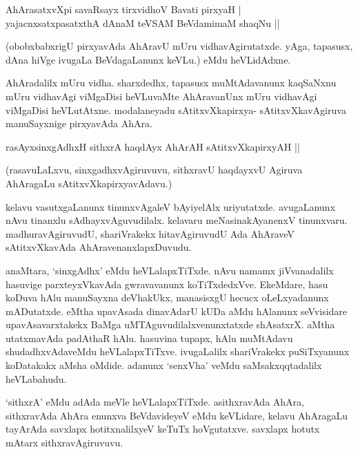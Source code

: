 \begin{shloka}
AhArasatxvXpi savaRsayx tirxvidhoV Bavati pirxyaH |\\
yajacnxsatxpasatxthA dAnaM teVSAM BeVdamimaM shaqNu ||
\end{shloka}

(obobxbabxrigU pirxyavAda AhAravU mUru vidhavAgirutatxde. yAga, tapasusx, dAna hiVge ivugaLa BeVdagaLanunx keVLu.) eMdu heVLidAdxne.


AhAradalilx mUru vidha. sharxdedhx, tapasusx muMtAdavanunx  kaqSaNxnu mUru vidhavAgi viMgaDisi heVLuvaMte AhAravanUnx mUru vidhavAgi viMgaDisi heVLutAtxne. modalaneyadu sAtitxvXkapirxya- sAtitxvXkavAgiruva manuSayxnige pirxyavAda AhAra.

\begin{shloka}
rasAyxsinxgAdhxH sithxrA haqdAyx AhArAH sAtitxvXkapirxyAH ||
\end{shloka}

(rasavuLaLxvu, sinxgadhxvAgiruvuvu, sithxravU haqdayxvU Agiruva AhAragaLu sAtitxvXkapirxyavAdavu.)

kelavu vasutxgaLanunx tinunxvAgaleV bAyiyelAlx uriyutatxde. avugaLanunx nAvu tinanxlu sAdhayxvAguvudilalx. kelavaru meNasinakAyanenxV tinunxvaru. madhuravAgiruvudU, shariVrakekx hitavAgiruvudU Ada AhAraveV sAtitxvXkavAda AhAravenanxlapxDuvudu.

anaMtara, `sinxgAdhx' eMdu heVLalapxTiTxde. nAvu namamx jiVvanadalilx hasuvige parxteyxVkavAda gwravavanunx koTiTxdedxVve. EkeMdare, hasu koDuva hAlu manuSayxna deVhakUkx, manasisxgU hecucx oLeLxyadanunx mADutatxde. eMtha upavAsada dinavAdarU kUDa aMdu hAlanunx seVvisidare upavAsavarxtakekx BaMga uMTAguvudilalxvenunxtatxde shAsatxrX. aMtha utatxmavAda padAthaR hAlu. hasuvina tupapx, hAlu muMtAdavu shudadhxvAdaveMdu heVLalapxTiTxve. ivugaLalilx shariVrakekx puSiTxyanunx koDatakakx aMsha oMdide. adanunx `senxVha' veMdu saMsakxqqtadalilx heVLabahudu.

`sithxrA' eMdu adAda meVle heVLalapxTiTxde. asithxravAda AhAra, sithxravAda AhAra enunxva BeVdavideyeV eMdu keVLidare, kelavu AhAragaLu tayArAda savxlapx hotitxnalilxyeV keTuTx hoVgutatxve. savxlapx hotutx mAtarx sithxravAgiruvuvu.

